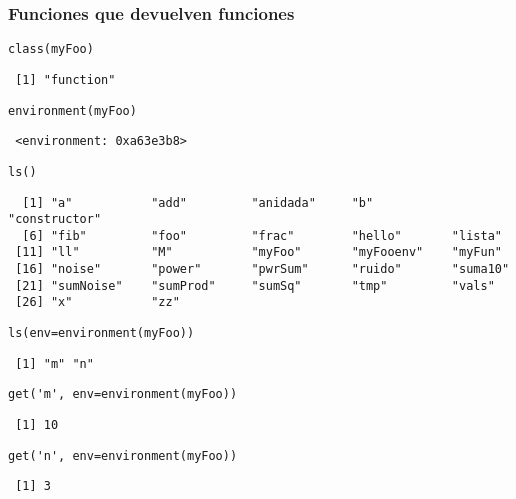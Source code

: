 \documentclass[xcolor={usenames,svgnames,dvipsnames}]{beamer}
\begin{document}
\begin{frame}[fragile]
\frametitle{Funciones que devuelven funciones}
\label{sec-2-6}


\lstset{language=R}
\begin{lstlisting}
class(myFoo)
\end{lstlisting}

\begin{verbatim}
 [1] "function"
\end{verbatim}


\lstset{language=R}
\begin{lstlisting}
environment(myFoo)
\end{lstlisting}

\begin{verbatim}
 <environment: 0xa63e3b8>
\end{verbatim}


\lstset{language=R}
\begin{lstlisting}
ls()
\end{lstlisting}

\begin{verbatim}
  [1] "a"           "add"         "anidada"     "b"           "constructor"
  [6] "fib"         "foo"         "frac"        "hello"       "lista"      
 [11] "ll"          "M"           "myFoo"       "myFooenv"    "myFun"      
 [16] "noise"       "power"       "pwrSum"      "ruido"       "suma10"     
 [21] "sumNoise"    "sumProd"     "sumSq"       "tmp"         "vals"       
 [26] "x"           "zz"
\end{verbatim}


\lstset{language=R}
\begin{lstlisting}
ls(env=environment(myFoo))
\end{lstlisting}

\begin{verbatim}
 [1] "m" "n"
\end{verbatim}


\lstset{language=R}
\begin{lstlisting}
get('m', env=environment(myFoo))
\end{lstlisting}

\begin{verbatim}
 [1] 10
\end{verbatim}


\lstset{language=R}
\begin{lstlisting}
get('n', env=environment(myFoo))
\end{lstlisting}

\begin{verbatim}
 [1] 3
\end{verbatim}
\end{frame}
\end{document}
